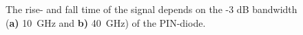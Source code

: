 \begin{figure}%
\centering
\caption{The rise- and fall time of the signal depends on the -3 dB bandwidth (\textbf{a)} 10~GHz and \textbf{b)} 40~GHz) of the PIN-diode.}
\label{fig:P2ExB_3dB}%
\end{figure}




